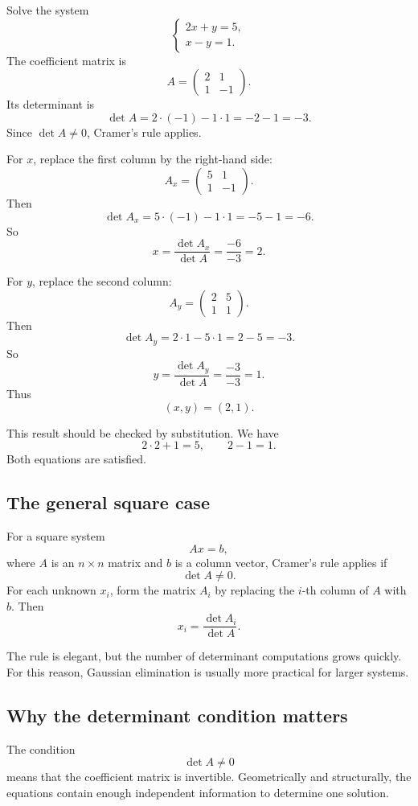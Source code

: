 \begin{examplebox}
Solve the system
\[
\begin{cases}
2x+y=5,\\
x-y=1.
\end{cases}
\]
The coefficient matrix is
\[
A=\begin{pmatrix}
2&1\\
1&-1
\end{pmatrix}.
\]
Its determinant is
\[
\det A=2\cdot(-1)-1\cdot1=-2-1=-3.
\]
Since \(\det A\ne0\), Cramer's rule applies.

For \(x\), replace the first column by the right-hand side:
\[
A_x=\begin{pmatrix}
5&1\\
1&-1
\end{pmatrix}.
\]
Then
\[
\det A_x=5\cdot(-1)-1\cdot1=-5-1=-6.
\]
So
\[
x=\frac{\det A_x}{\det A}=\frac{-6}{-3}=2.
\]

For \(y\), replace the second column:
\[
A_y=\begin{pmatrix}
2&5\\
1&1
\end{pmatrix}.
\]
Then
\[
\det A_y=2\cdot1-5\cdot1=2-5=-3.
\]
So
\[
y=\frac{\det A_y}{\det A}=\frac{-3}{-3}=1.
\]
Thus
\[
(x,y)=(2,1).
\]
\end{examplebox}

This result should be checked by substitution. We have
\[
2\cdot2+1=5,
\qquad
2-1=1.
\]
Both equations are satisfied.

\subsection*{The general square case}

For a square system
\[
Ax=b,
\]
where \(A\) is an \(n\times n\) matrix and \(b\) is a column vector, Cramer's rule applies if
\[
\det A\ne0.
\]
For each unknown \(x_i\), form the matrix \(A_i\) by replacing the \(i\)-th column of \(A\) with \(b\). Then
\[
x_i=\frac{\det A_i}{\det A}.
\]

The rule is elegant, but the number of determinant computations grows quickly. For this reason, Gaussian elimination is usually more practical for larger systems.

\subsection*{Why the determinant condition matters}

The condition
\[
\det A\ne0
\]
means that the coefficient matrix is invertible. Geometrically and structurally, the equations contain enough independent information to determine one solution.

